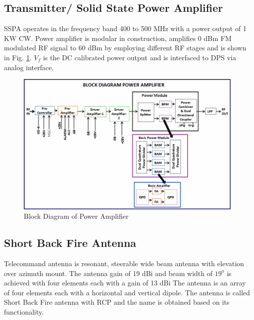 
\subsection{Transmitter/ Solid State Power Amplifier}
SSPA operates in the frequency band 400 to 500 MHz with a power output of 1 KW CW. Power amplifier is modular in construction, amplifies 0 dBm FM modulated RF signal to 60 dBm by employing different RF stages  and is shown in Fig. \ref{FIG:BlockPA}. ${V}_{f}$ is the DC calibrated power output and is interfaced to DPS via analog interface.

\begin{figure}[H]
	\centering
	\includegraphics[width=\linewidth]{./Diagrams/BlockPA.png}
	\caption{Block Diagram of Power Amplifier}
	\label{FIG:BlockPA}
\end{figure}

\subsection{Short Back Fire Antenna}
Telecommand antenna is resonant, steerable wide beam antenna with elevation over azimuth mount. The antenna gain of 19 dBi and beam width of ${19}^{o}$ is achieved with four elements each with a gain of 13 dBi The antenna is an array of four elements each with a horizontal and vertical dipole. The antenna is called Short Back Fire antenna with RCP and the name is obtained based on its functionality. 

